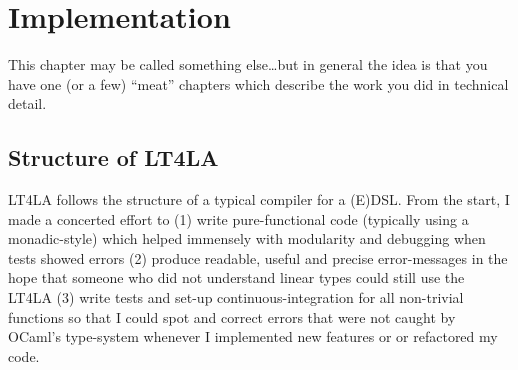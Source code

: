 \chapter{Implementation}\label{chap:impl}

\begin{guidance}
This chapter may be called something else\ldots but in general
the idea is that you have one (or a few) ``meat'' chapters which
describe the work you did in technical detail.
\end{guidance}

%

\section{Structure of LT4LA}

LT4LA follows the structure of a typical compiler for a (E)DSL\@. From the
start, I made a concerted effort to (1) write pure-functional code (typically
using a monadic-style) which helped immensely with modularity and debugging
when tests showed errors (2) produce readable, useful and precise
error-messages in the hope that someone who did not understand linear types
could still use the LT4LA (3) write tests and set-up
continuous-integration for all non-trivial functions so that I could spot and
correct errors that were not caught by OCaml's type-system whenever I
implemented new features or or refactored my code.

